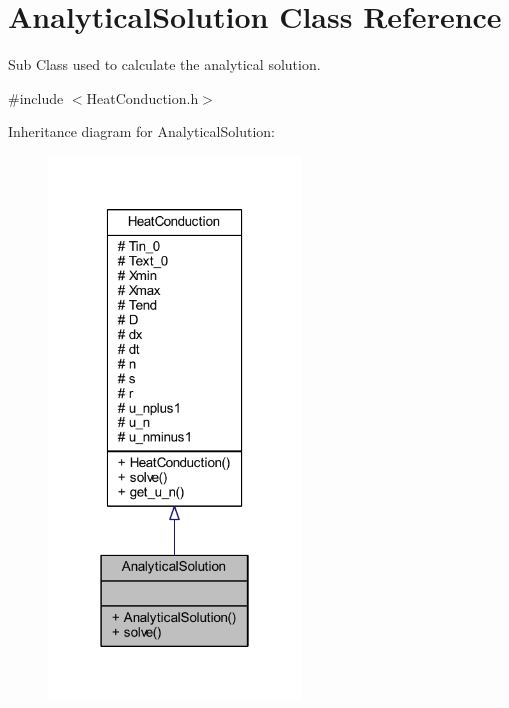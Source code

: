 \hypertarget{class_analytical_solution}{}\section{Analytical\+Solution Class Reference}
\label{class_analytical_solution}


Sub Class used to calculate the analytical solution.  




{\ttfamily \#include $<$Heat\+Conduction.\+h$>$}



Inheritance diagram for Analytical\+Solution\+:
\nopagebreak
\begin{figure}[H]
\begin{center}
\leavevmode
\includegraphics[width=190pt]{class_analytical_solution__inherit__graph}
\end{center}
\end{figure}


